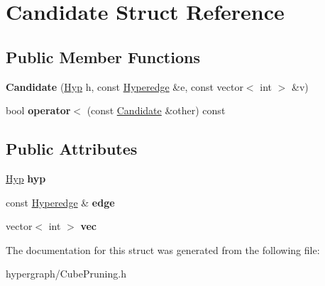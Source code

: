 \hypertarget{structCandidate}{
\section{Candidate Struct Reference}
\label{structCandidate}
}
\subsection*{Public Member Functions}
\begin{DoxyCompactItemize}
\item 
\hypertarget{structCandidate_ac13c7ec637d37b63fc4d6bf3361fd449}{
{\bfseries Candidate} (\hyperlink{structHyp}{Hyp} h, const \hyperlink{classScarab_1_1HG_1_1Hyperedge}{Hyperedge} \&e, const vector$<$ int $>$ \&v)}
\label{structCandidate_ac13c7ec637d37b63fc4d6bf3361fd449}

\item 
\hypertarget{structCandidate_a5644a3a3d2d92498923ecc443bb4583c}{
bool {\bfseries operator$<$} (const \hyperlink{structCandidate}{Candidate} \&other) const }
\label{structCandidate_a5644a3a3d2d92498923ecc443bb4583c}

\end{DoxyCompactItemize}
\subsection*{Public Attributes}
\begin{DoxyCompactItemize}
\item 
\hypertarget{structCandidate_a22db5a9c75fdebb31827505d6bc7d274}{
\hyperlink{structHyp}{Hyp} {\bfseries hyp}}
\label{structCandidate_a22db5a9c75fdebb31827505d6bc7d274}

\item 
\hypertarget{structCandidate_acdb6d12cbf33f6e78b97fed5013a181b}{
const \hyperlink{classScarab_1_1HG_1_1Hyperedge}{Hyperedge} \& {\bfseries edge}}
\label{structCandidate_acdb6d12cbf33f6e78b97fed5013a181b}

\item 
\hypertarget{structCandidate_afe2daf1c20513a5489d8407492ca7597}{
vector$<$ int $>$ {\bfseries vec}}
\label{structCandidate_afe2daf1c20513a5489d8407492ca7597}

\end{DoxyCompactItemize}


The documentation for this struct was generated from the following file:\begin{DoxyCompactItemize}
\item 
hypergraph/CubePruning.h\end{DoxyCompactItemize}
